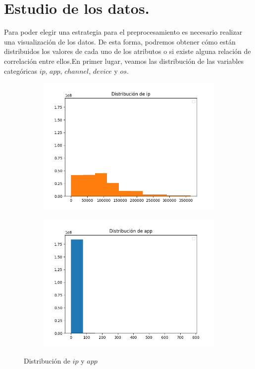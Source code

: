 \chapter[Visualización]{Estudio de los datos.}
Para poder elegir una estrategia para el preprocesamiento es necesario realizar una visualización de los datos. De esta forma, podremos obtener cómo están distribuidos los valores de cada uno de los atributos o si existe alguna relación de correlación entre ellos.En primer lugar, veamos las distribución de las variables categóricas $ip$, $app$, $channel$, $device$ y $os$.
\begin{figure}[H]
	\centering
	\begin{subfigure}{.5\textwidth}
		\centering
		\includegraphics[scale=0.5]{img/ip_distribution.png}
	\end{subfigure}%
	\begin{subfigure}{.5\textwidth}
		\centering
		\includegraphics[scale=0.5]{img/app_distribution.png}
	\end{subfigure}
	\caption{Distribución de $ip$ y $app$}
\end{figure}
